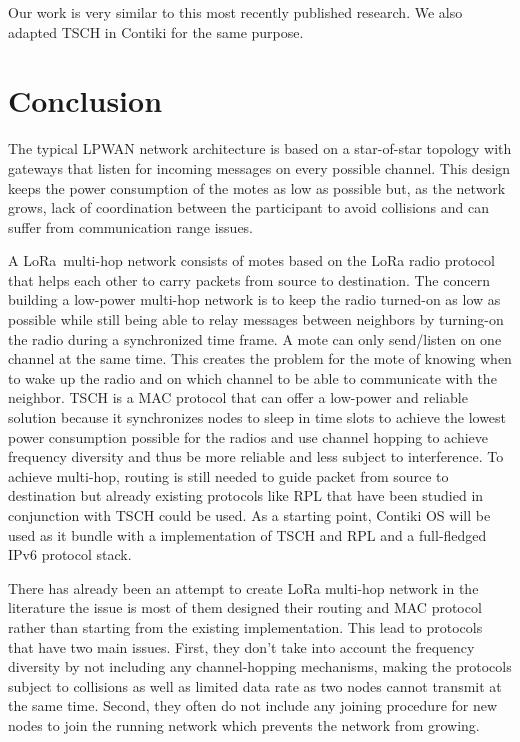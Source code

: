 Our work is very similar to this most recently published research.
We also adapted TSCH in Contiki for the same purpose.


\section{Conclusion}

The typical LPWAN network architecture is based on a star-of-star topology
with gateways that listen for incoming messages on every possible channel.
This design keeps the power consumption of the motes as low as possible
but, as the network grows, lack of coordination between the participant to avoid
collisions and can suffer from communication range issues.

A LoRa multi-hop network consists of motes based on the LoRa radio protocol
that helps each other to carry packets from source to destination.
The concern building a low-power multi-hop network is to keep
the radio turned-on as low as possible while still being able to relay
messages between neighbors by turning-on the radio during a synchronized time frame.
A mote can only send/listen on one channel at the same time.
This creates the problem for the mote of knowing when to wake up the radio and
on which channel to be able to communicate with the neighbor.
TSCH is a MAC protocol that
can offer a low-power and reliable solution because it synchronizes nodes
to sleep in time slots to achieve the lowest power consumption possible for the
radios and use channel hopping to achieve frequency diversity and thus be
more reliable and less subject to interference.
To achieve multi-hop, routing is still needed to guide packet from source
to destination but already existing protocols like RPL that have been studied
in conjunction with TSCH could be used.
As a starting point, Contiki OS will be used as it bundle with a
implementation of TSCH and RPL and a full-fledged IPv6 protocol stack.

There has already been an attempt to create LoRa multi-hop network in the
literature the issue is most of them designed their routing and MAC protocol
rather than starting from the existing implementation.
This lead to protocols that have two main issues.
First, they don't take into account the frequency diversity by
not including any channel-hopping mechanisms, making the protocols subject to
collisions as well as limited data rate as two nodes cannot transmit at the same time.
Second, they often do not include any joining procedure
for new nodes to join the running network which prevents the network from growing.
